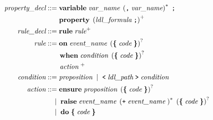 \documentclass[preview=true]{standalone}
\begin{document}
\begin{table}[t]
\begin{align*}
  \textit{property\_decl} &::=
  \textbf{variable}\;
    \textit{var\_name}\;
    \left(\texttt{,}\; \textit{var\_name}\right)^\ast\; \texttt{;}
  \\&\hspace{1.9em}
  \textbf{property}\;
  \left(\textit{ldl\_formula}\; \texttt{;}\right)^+
  \\
  \textit{rule\_decl} &::= \textbf{rule}\;
  \textit{rule}^+
  \\
  \textit{rule} &::=
  \textbf{on}\; \textit{event\_name}\;
  \left( \textbf{\{}\; \textit{code}\; \textbf{\}} \right)^?
  \\&\qquad
  \textbf{when}\; \textit{condition}\;
  \left( \textbf{\{}\; \textit{code}\; \textbf{\}} \right)^?
  \\&\qquad
  \textit{action}\;^+
  \\
  \textit{condition} &::= \textit{proposition}\;
  \mid\;
  \texttt{<}\; \textit{ldl\_path}\; \texttt{>}\; \textit{condition}
  \\
  \textit{action} &::=
  \textbf{ensure}\; \textit{proposition}\;
  \left( \textbf{\{}\; \textit{code}\; \textbf{\}} \right)^?
  \\&\quad
  \mid\;
  \textbf{raise}\; \textit{event\_name}\; \left(\texttt{+}\; \textit{event\_name}\; \right)^\ast\;
  \left( \textbf{\{}\; \textit{code}\; \textbf{\}} \right)^?
  \\&\quad
  \mid\;
  \textbf{do}\;
    \textbf{\{}\; \textit{code}\; \textbf{\}}
\end{align*}
\end{table}
\smallskip
\end{document}
